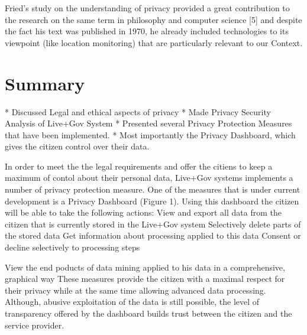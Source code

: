 \documentclass[external]{20120615_deliverable_template_ukob}
\theoremstyle{definition}
\begin{document}
Fried’s study on the understanding of privacy provided a great
contribution to the research on the same term in philosophy and
computer science [5] and despite the fact his text was published in
1970, he already included technologies to its viewpoint (like location
monitoring) that are particularly relevant to our Context.




\clearpage



\chapter{Summary}\label{chap:Summary}
* Discussed Legal and ethical aspects of privacy
* Made Privacy Security Analysis of Live+Gov System
* Presented several Privacy Protection Measures that have been implemented.
* Most importantly the Privacy Dashboard, which gives the citizen control over their data.

In order to meet the the legal requirements and offer the citiens to
keep a maximum of contol about their personal data, Live+Gov systems
implements a number of privacy protection measure. One of the measures
that is under current development is a Privacy Dashboard (Figure
1). Using this dashboard the citizen will be able to take the
following actions: View and export all data from the citizen that is
currently stored in the Live+Gov system Selectively delete parts of
the stored data Get information about processing applied to this data
Consent or decline selectively to processing steps

View the end poducts of data mining applied to his data in a
comprehensive, graphical way These measures provide the citizen with a
maximal respect for their privacy while at the same time allowing
advanced data processing. Although, abusive exploitation of the data
is still possible, the level of transparency offered by the dashboard
builds trust between the citizen and the service provider.



\end{document}
